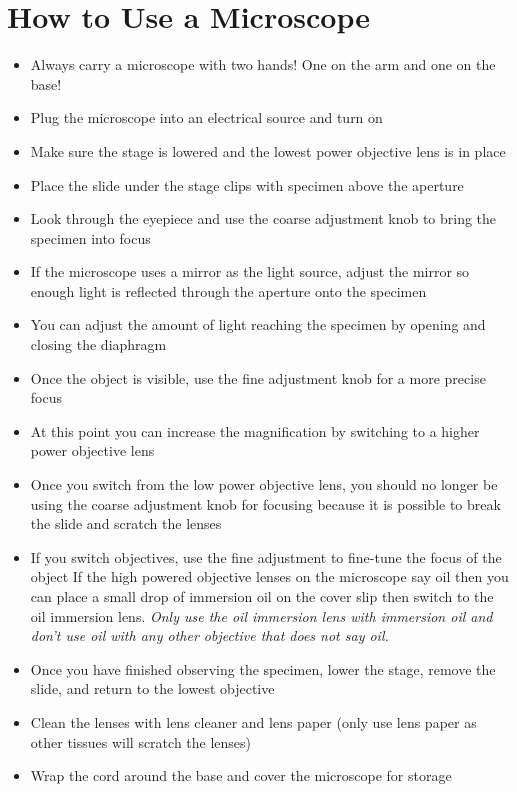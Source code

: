 \section{How to Use a Microscope}

\begin{itemize}

\item{Always carry a microscope with two hands! One on the arm and one on the base!}

\item{Plug the microscope into an electrical source and turn on}

\item{Make sure the stage is lowered and the lowest power objective lens is in place}

\item{Place the slide under the stage clips with specimen above the aperture}

\item{Look through the eyepiece and use the coarse adjustment knob to bring the specimen into focus}

\item{If the microscope uses a mirror as the light source, adjust the mirror so enough light is reflected through the aperture onto the specimen}

\item{You can adjust the amount of light reaching the specimen by opening and closing the diaphragm}

\item{Once the object is visible, use the fine adjustment knob for a more precise focus}

\item{At this point you can increase the magnification by switching to a higher power objective lens}

\item{Once you switch from the low power objective lens, you should no longer be using the coarse adjustment knob for focusing because it is possible to break the slide and scratch the lenses}

\item{If you switch objectives, use the fine adjustment to fine-tune the focus of the object
If the high powered objective lenses on the microscope say oil then you can place a small drop of immersion oil on the cover slip then switch to the oil immersion lens. \textit{Only use the oil immersion lens with immersion oil and don’t use oil with any other objective that does not say oil.}}

\item{Once you have finished observing the specimen, lower the stage, remove the slide, and return to the lowest objective}

\item{Clean the lenses with lens cleaner and lens paper (only use lens paper as other tissues will scratch the lenses)}

\item{Wrap the cord around the base and cover the microscope for storage}

\end{itemize}

